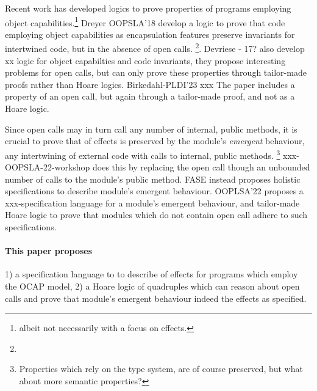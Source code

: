 Recent work has developed logics to prove properties of programs employing object capabilities.\footnote{albeit not necessarily with a focus on \tamed effects.}
Dreyer OOPSLA'18 develop a logic to prove that   code employing object capabilities as encapsulation features preserve invariants for intertwined code, but in the absence of open calls. 
 \footnote{}.
Devriese - 17? also develop xx logic for object capabilties and code invariants, they propose interesting problems for open calls, 
but can only prove these properties through tailor-made proofs rather than Hoare logics.
Birkedahl-PLDI'23 xxx The paper includes a property of an open call, but again through a tailor-made proof, and not as a Hoare logic.


Since open calls may in turn call any number of internal, public methods, 
it is crucial  to prove that \taming of effects is preserved by the module's 
\emph{emergent} behaviour, \ie any intertwining of external code with calls to internal, public methods.
\footnote{Properties which rely on the type system, are of course preserved, but what about more semantic properties?}
xxx-OOPSLA-22-workshop does this by replacing the open call though an unbounded number of calls to the module's public method.
 FASE instead proposes holistic specifications to describe   module's emergent behaviour. 
 OOPLSA'22 proposes a xxx-specification language for a module's emergent behaviour, and  tailor-made Hoare logic to prove that modules which do not contain open call adhere to such specifications.




\paragraph{This paper proposes} %
1) a specification language to to describe  \taming of effects for  programs which employ the OCAP model, 
 2)  a Hoare logic of quadruples which can reason about open calls and prove that module's emergent behaviour indeed \tames the effects as specified.
 
